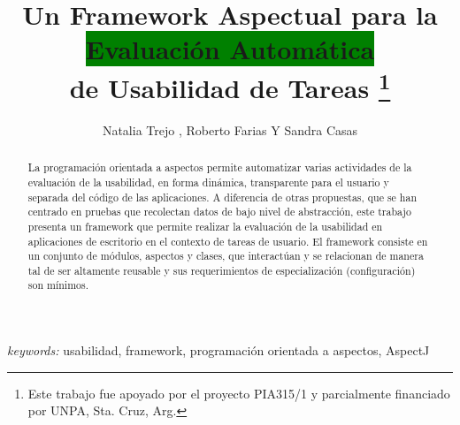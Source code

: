 \documentclass[spanish]{llncs}
\begin{document}

\title{Un Framework Aspectual para la \colorbox{green}{Evaluación Automática} \\ de Usabilidad de Tareas
\thanks{Este trabajo fue apoyado por el proyecto PIA315/1 y parcialmente financiado por UNPA, Sta. Cruz, Arg.}}


\author{
Natalia Trejo , 
 Roberto Farias Y
 Sandra Casas    
}







\maketitle


\begin{abstract}
La programación orientada a aspectos permite automatizar varias actividades de la evaluación de la usabilidad, en forma dinámica, transparente para el usuario y separada del código de las aplicaciones. A diferencia de otras propuestas, que se han centrado en pruebas que recolectan datos de bajo nivel de abstracción, este trabajo presenta un framework que permite realizar la evaluación de la usabilidad en aplicaciones de escritorio en el contexto de tareas de usuario. El framework consiste en un conjunto de módulos, aspectos y clases, que interactúan y se relacionan de manera tal de ser altamente reusable y sus requerimientos de especialización (configuración) son mínimos. 
\end{abstract}
{\em keywords:} usabilidad, framework, programación orientada a aspectos, AspectJ















\end{document}
